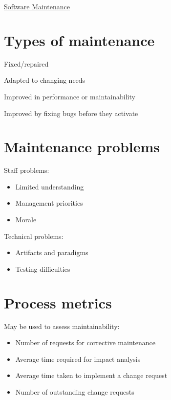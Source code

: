 \documentclass{article}[18pt]
\begin{document}
\begin{center}
\underline{\huge Software Maintenance}
\end{center}
\section{Types of maintenance}
\begin{definition}
	Fixed/repaired
\end{definition}
\begin{definition}
	Adapted to changing needs
\end{definition}
\begin{definition}
	Improved in performance or maintainability
\end{definition}
\begin{definition}
	Improved by fixing bugs before they activate
\end{definition}
\section{Maintenance problems}
Staff problems:
\begin{itemize}
	\item Limited understanding
	\item Management priorities
	\item Morale
\end{itemize}
Technical problems:
\begin{itemize}
	\item Artifacts and paradigms
	\item Testing difficulties
\end{itemize}
\section{Process metrics}
May be used to assess maintainability:
\begin{itemize}
	\item Number of requests for corrective maintenance
	\item Average time required for impact analysis
	\item Average time taken to implement a change request
	\item Number of outstanding change requests
\end{itemize}
\end{document}

